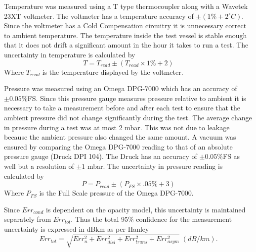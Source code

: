 Temperature was measured using a T type thermocoupler along with a Wavetek 23XT voltmeter. The voltmeter has a temperature accuracy of $\pm (1\% + 2^\circ C)$. Since the voltmeter has a Cold Compensation circuitry it is unnecessary correct to ambient temperature. The temperature inside the test vessel is stable enough that it does not drift a significant amount in the hour it takes to run a test. The uncertainty in temperature is calculated by
\begin{equation}
T = T_{read} \pm ( T_{read} \times 1\% + 2)
\end{equation}
Where $T_{read}$ is the temperature displayed by the voltmeter.

Pressure was measured using an Omega DPG-7000 which has an accuracy of $\pm 0.05\%$FS. Since this pressure gauge measures pressure relative to ambient it is necessary to take a measurement before and after each test to ensure that the ambient pressure did not change significantly during the test. The average change in pressure during a test was at most 2 mbar. This was not due to leakage because the ambient pressure also changed the same amount.
A vacuum was ensured by comparing the Omega DPG-7000 reading to that of an absolute pressure gauge (Druck DPI 104). The Druck has an accuracy of $\pm 0.05\%$FS as well but a resolution of $\pm 1$ mbar. The uncertainty in pressure reading is calculated by
\begin{equation}
P = P_{read} \pm ( P_{FS} \times .05\% + 3)
\end{equation}
Where $P_{FS}$ is the Full Scale pressure of the Omega DPG-7000.

Since $Err_{cond}$ is dependent on the opacity model, this uncertainty is maintained separately from $Err_{tot}$. Thus the total 95\% confidence for the measurement uncertainty is expressed in dB\/km as per Hanley \cite{Hanley-thesis}
\begin{equation}
Err_{tot} = \sqrt{Err_n^2 + Err_{diel}^2 + Err_{trans}^2 + Err_{asym}^2} \;(dB/km).
\end{equation}
